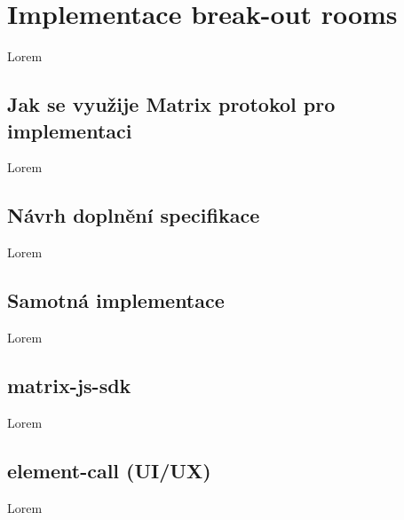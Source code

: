 \section{Implementace break-out rooms}\label{breakoutRooms}

Lorem

\subsection{Jak se využije Matrix protokol pro implementaci}

Lorem

\subsection{Návrh doplnění specifikace}

Lorem

\subsection{Samotná implementace}

Lorem

\subsection{matrix-js-sdk}

Lorem

\subsection{element-call (UI/UX) }

Lorem
